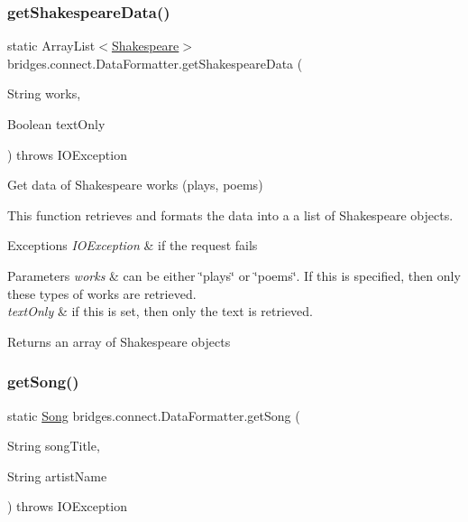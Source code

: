 \subsubsection{\texorpdfstring{get\+Shakespeare\+Data()}{getShakespeareData()}}
{\footnotesize\ttfamily static Array\+List$<$\hyperlink{classbridges_1_1data__src__dependent_1_1_shakespeare}{Shakespeare}$>$ bridges.\+connect.\+Data\+Formatter.\+get\+Shakespeare\+Data (\begin{DoxyParamCaption}\item[{String}]{works,  }\item[{Boolean}]{text\+Only }\end{DoxyParamCaption}) throws I\+O\+Exception\hspace{0.3cm}{\ttfamily [static]}}

Get data of Shakespeare works (plays, poems)

This function retrieves and formats the data into a a list of Shakespeare objects.


\begin{DoxyExceptions}{Exceptions}
{\em I\+O\+Exception} & if the request fails\\
\hline
\end{DoxyExceptions}

\begin{DoxyParams}{Parameters}
{\em works} & can be either \char`\"{}plays\char`\"{} or \char`\"{}poems\char`\"{}. If this is specified, then only these types of works are retrieved. \\
\hline
{\em text\+Only} & if this is set, then only the text is retrieved. \\
\hline
\end{DoxyParams}
\begin{DoxyReturn}{Returns}
an array of Shakespeare objects 
\end{DoxyReturn}
\mbox{\label{classbridges_1_1connect_1_1_data_formatter_ad1d2071025ce9daa42ab69af8eb4749b}} 
\subsubsection{\texorpdfstring{get\+Song()}{getSong()}}
{\footnotesize\ttfamily static \hyperlink{classbridges_1_1data__src__dependent_1_1_song}{Song} bridges.\+connect.\+Data\+Formatter.\+get\+Song (\begin{DoxyParamCaption}\item[{String}]{song\+Title,  }\item[{String}]{artist\+Name }\end{DoxyParamCaption}) throws I\+O\+Exception\hspace{0.3cm}{\ttfamily [static]}}

